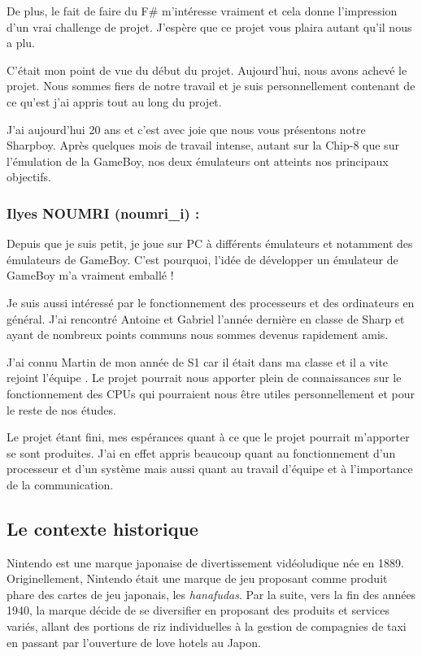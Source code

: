 \documentclass[12pt, a4paper]{article}
\begin{document}
\bigskip
De plus, le fait de faire du F\# m’intéresse vraiment et cela donne l’impression d’un vrai challenge de projet. J’espère que ce projet vous plaira autant qu’il nous a plu.

\bigskip
C'était mon point de vue du début du projet. Aujourd'hui, nous avons achevé le projet. Nous sommes fiers de notre travail et je suis personnellement contenant de ce qu'est j'ai appris tout au long du projet.

\bigskip
J'ai aujourd'hui 20 ans et c'est avec joie que nous vous présentons notre Sharpboy. Après quelques mois de travail intense, autant sur la Chip-8 que sur l'émulation de la GameBoy, nos deux émulateurs ont atteints nos principaux objectifs. 

\pagebreak
\subsubsection{Ilyes  NOUMRI (noumri\_i) :}
\medskip

Depuis que je suis petit, je joue sur PC à différents émulateurs et notamment des émulateurs de GameBoy. C’est pourquoi, l’idée de développer un émulateur de GameBoy m’a vraiment emballé !
\medskip

Je suis aussi intéressé par le fonctionnement des processeurs et des ordinateurs en général. J’ai rencontré Antoine et Gabriel l’année dernière en classe de Sharp et ayant de nombreux points communs nous sommes devenus rapidement amis. 
\medskip

J’ai connu Martin de mon année de S1 car il était dans ma classe et il a vite rejoint l’équipe . Le projet pourrait nous apporter plein de connaissances sur le fonctionnement des CPUs qui pourraient nous être utiles personnellement et pour le reste de nos études.

\bigskip
Le projet étant fini, mes espérances quant à ce que le projet pourrait m'apporter se sont produites. J'ai en effet appris beaucoup quant au fonctionnement d'un processeur et d'un système mais aussi quant au travail d'équipe et à l'importance de la communication. 

\pagebreak
\bigskip
\subsection{Le contexte historique}
Nintendo est une marque japonaise de divertissement vidéoludique née en 1889. Originellement, Nintendo était une marque de jeu proposant comme produit phare des cartes de jeu japonais, les \textit{hanafudas}. Par la suite, vers la fin des années 1940, la marque décide de se diversifier en proposant des produits et services variés, allant des portions de riz individuelles à la gestion de compagnies de taxi en passant par l'ouverture de love hotels au Japon.
\end{document}
